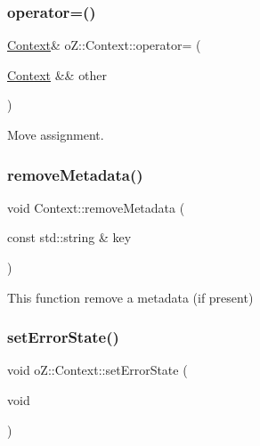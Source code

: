 \subsubsection{\texorpdfstring{operator=()}{operator=()}\hspace{0.1cm}{\footnotesize\ttfamily [2/2]}}
{\footnotesize\ttfamily \mbox{\hyperlink{classo_z_1_1_context}{Context}}\& o\+Z\+::\+Context\+::operator= (\begin{DoxyParamCaption}\item[{\mbox{\hyperlink{classo_z_1_1_context}{Context}} \&\&}]{other }\end{DoxyParamCaption})\hspace{0.3cm}{\ttfamily [default]}}



Move assignment. 

\mbox{\label{classo_z_1_1_context_a581fb3a0615050358b76f9216d3619e8}} 
\subsubsection{\texorpdfstring{removeMetadata()}{removeMetadata()}}
{\footnotesize\ttfamily void Context\+::remove\+Metadata (\begin{DoxyParamCaption}\item[{const std\+::string \&}]{key }\end{DoxyParamCaption})}



This function remove a metadata (if present) 

\mbox{\label{classo_z_1_1_context_a036d993634650ee8414c2f12d49d0204}} 
\subsubsection{\texorpdfstring{setErrorState()}{setErrorState()}}
{\footnotesize\ttfamily void o\+Z\+::\+Context\+::set\+Error\+State (\begin{DoxyParamCaption}\item[{void}]{ }\end{DoxyParamCaption})\hspace{0.3cm}{\ttfamily [inline]}}



